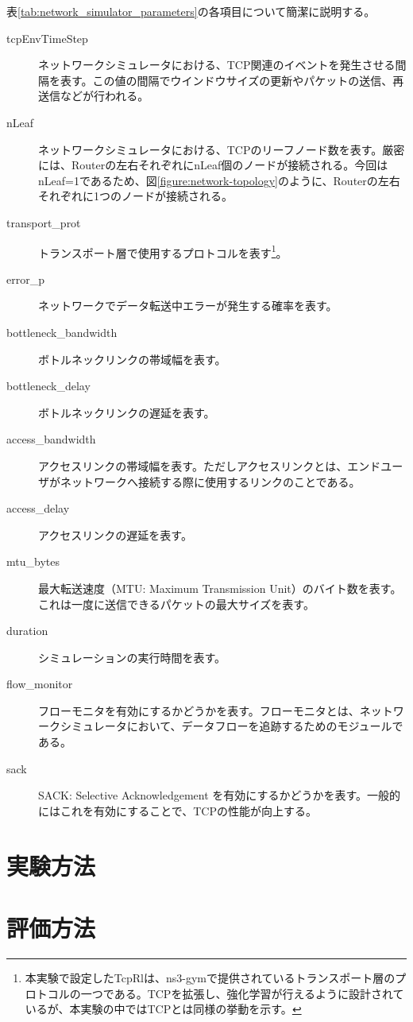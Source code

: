 \documentclass[a4paper,11pt]{jreport}
\newcommand{\figref}[1]{図\ref{#1}}
\newcommand{\tabref}[1]{表\ref{#1}}
\begin{document}
\tabref{tab:network_simulator_parameters}の各項目について簡潔に説明する。
\begin{description}
  \item[tcpEnvTimeStep] ネットワークシミュレータにおける、TCP関連のイベントを発生させる間隔を表す。この値の間隔でウインドウサイズの更新やパケットの送信、再送信などが行われる。
  \item[nLeaf] ネットワークシミュレータにおける、TCPのリーフノード数を表す。厳密には、Routerの左右それぞれにnLeaf個のノードが接続される。今回はnLeaf=1であるため、\figref{figure:network-topology}のように、Routerの左右それぞれに1つのノードが接続される。
  \item[transport\_prot] トランスポート層で使用するプロトコルを表す\footnote{本実験で設定したTcpRlは、ns3-gymで提供されているトランスポート層のプロトコルの一つである。TCPを拡張し、強化学習が行えるように設計されているが、本実験の中ではTCPとは同様の挙動を示す。}。
  \item[error\_p] ネットワークでデータ転送中エラーが発生する確率を表す。
  \item[bottleneck\_bandwidth] ボトルネックリンクの帯域幅を表す。
  \item[bottleneck\_delay] ボトルネックリンクの遅延を表す。
  \item[access\_bandwidth] アクセスリンクの帯域幅を表す。ただしアクセスリンクとは、エンドユーザがネットワークへ接続する際に使用するリンクのことである。
  \item[access\_delay] アクセスリンクの遅延を表す。
  \item[mtu\_bytes] 最大転送速度（MTU: Maximum Transmission Unit）のバイト数を表す。これは一度に送信できるパケットの最大サイズを表す。
  \item[duration] シミュレーションの実行時間を表す。
  \item[flow\_monitor] フローモニタを有効にするかどうかを表す。フローモニタとは、ネットワークシミュレータにおいて、データフローを追跡するためのモジュールである。
  \item[sack] SACK: Selective Acknowledgement を有効にするかどうかを表す。一般的にはこれを有効にすることで、TCPの性能が向上する。
\end{description}


\section{実験方法}

\section{評価方法}
\label{section:evaluation-method}
\end{document}
